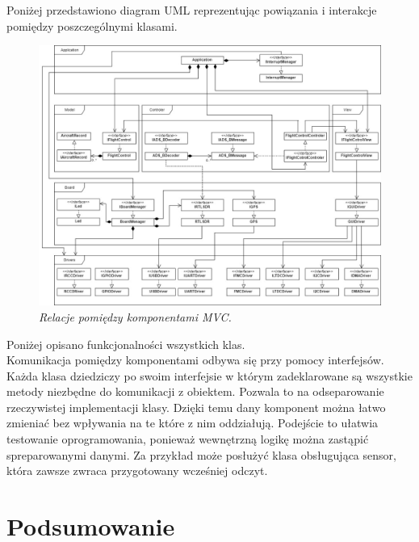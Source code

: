 \documentclass[eng,printmode]{mgr}
\begin{document}
Poniżej przedstawiono diagram UML reprezentując powiązania i interakcje pomiędzy poszczególnymi klasami.
\vskip 0.55cm
\begin{figure}[!h]
    \centering
    \includegraphics[height=\textwidth, angle=90]{plots/uml.png}
    \caption{\textit{\scriptsize Relacje pomiędzy komponentami MVC.}}
\end{figure}

Poniżej opisano funkcjonalności wszystkich klas.
\\


Komunikacja pomiędzy komponentami odbywa się przy pomocy interfejsów. Każda klasa dziedziczy po swoim interfejsie w którym zadeklarowane są wszystkie metody niezbędne do komunikacji z obiektem. Pozwala to na odseparowanie rzeczywistej implementacji klasy. Dzięki temu dany komponent można łatwo zmieniać bez wpływania na te które z nim oddziałują. Podejście to ułatwia testowanie oprogramowania, ponieważ wewnętrzną logikę można zastąpić spreparowanymi danymi. Za przykład może posłużyć klasa obsługująca sensor, która zawsze zwraca przygotowany wcześniej odczyt. 
\chapter{ Podsumowanie }



\end{document}
